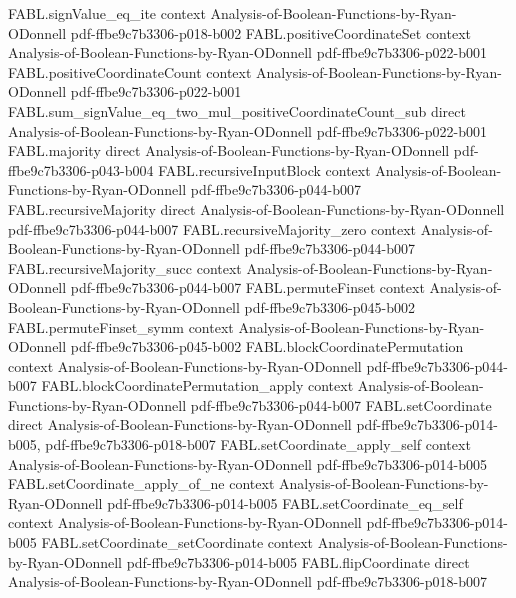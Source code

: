 \begin{theorem}
\proofstep
  {FABL.signValue_eq_ite}
  {context}
  {Analysis-of-Boolean-Functions-by-Ryan-ODonnell}
  {pdf-ffbe9c7b3306-p018-b002}
\proofstep
  {FABL.positiveCoordinateSet}
  {context}
  {Analysis-of-Boolean-Functions-by-Ryan-ODonnell}
  {pdf-ffbe9c7b3306-p022-b001}
\proofstep
  {FABL.positiveCoordinateCount}
  {context}
  {Analysis-of-Boolean-Functions-by-Ryan-ODonnell}
  {pdf-ffbe9c7b3306-p022-b001}
\proofstep
  {FABL.sum_signValue_eq_two_mul_positiveCoordinateCount_sub}
  {direct}
  {Analysis-of-Boolean-Functions-by-Ryan-ODonnell}
  {pdf-ffbe9c7b3306-p022-b001}
\proofstep
  {FABL.majority}
  {direct}
  {Analysis-of-Boolean-Functions-by-Ryan-ODonnell}
  {pdf-ffbe9c7b3306-p043-b004}
\proofstep
  {FABL.recursiveInputBlock}
  {context}
  {Analysis-of-Boolean-Functions-by-Ryan-ODonnell}
  {pdf-ffbe9c7b3306-p044-b007}
\proofstep
  {FABL.recursiveMajority}
  {direct}
  {Analysis-of-Boolean-Functions-by-Ryan-ODonnell}
  {pdf-ffbe9c7b3306-p044-b007}
\proofstep
  {FABL.recursiveMajority_zero}
  {context}
  {Analysis-of-Boolean-Functions-by-Ryan-ODonnell}
  {pdf-ffbe9c7b3306-p044-b007}
\proofstep
  {FABL.recursiveMajority_succ}
  {context}
  {Analysis-of-Boolean-Functions-by-Ryan-ODonnell}
  {pdf-ffbe9c7b3306-p044-b007}
\proofstep
  {FABL.permuteFinset}
  {context}
  {Analysis-of-Boolean-Functions-by-Ryan-ODonnell}
  {pdf-ffbe9c7b3306-p045-b002}
\proofstep
  {FABL.permuteFinset_symm}
  {context}
  {Analysis-of-Boolean-Functions-by-Ryan-ODonnell}
  {pdf-ffbe9c7b3306-p045-b002}
\proofstep
  {FABL.blockCoordinatePermutation}
  {context}
  {Analysis-of-Boolean-Functions-by-Ryan-ODonnell}
  {pdf-ffbe9c7b3306-p044-b007}
\proofstep
  {FABL.blockCoordinatePermutation_apply}
  {context}
  {Analysis-of-Boolean-Functions-by-Ryan-ODonnell}
  {pdf-ffbe9c7b3306-p044-b007}
\proofstep
  {FABL.setCoordinate}
  {direct}
  {Analysis-of-Boolean-Functions-by-Ryan-ODonnell}
  {pdf-ffbe9c7b3306-p014-b005,
    pdf-ffbe9c7b3306-p018-b007}
\proofstep
  {FABL.setCoordinate_apply_self}
  {context}
  {Analysis-of-Boolean-Functions-by-Ryan-ODonnell}
  {pdf-ffbe9c7b3306-p014-b005}
\proofstep
  {FABL.setCoordinate_apply_of_ne}
  {context}
  {Analysis-of-Boolean-Functions-by-Ryan-ODonnell}
  {pdf-ffbe9c7b3306-p014-b005}
\proofstep
  {FABL.setCoordinate_eq_self}
  {context}
  {Analysis-of-Boolean-Functions-by-Ryan-ODonnell}
  {pdf-ffbe9c7b3306-p014-b005}
\proofstep
  {FABL.setCoordinate_setCoordinate}
  {context}
  {Analysis-of-Boolean-Functions-by-Ryan-ODonnell}
  {pdf-ffbe9c7b3306-p014-b005}
\proofstep
  {FABL.flipCoordinate}
  {direct}
  {Analysis-of-Boolean-Functions-by-Ryan-ODonnell}
  {pdf-ffbe9c7b3306-p018-b007}

\end{theorem}
